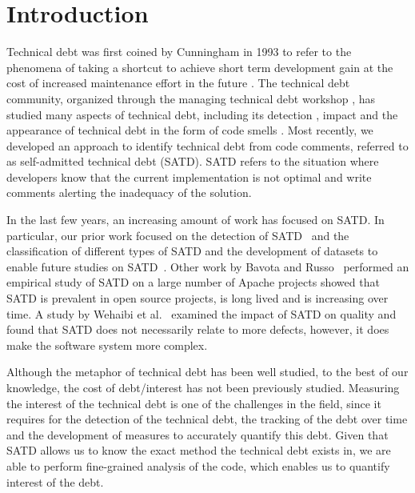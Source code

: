 \section{Introduction}
Technical debt was first coined by Cunningham in 1993 to refer to the phenomena of taking a shortcut to achieve short term development gain at the cost of increased maintenance effort in the future \cite{Cunningham1992WPM}. The technical debt community, organized through the managing technical debt workshop \cite{MTD2016}, has studied many aspects of technical debt, including its detection \cite{Zazworka2013EASE}, impact \cite{Zazworka2011MTD} and the appearance of technical debt in the form of code smells \cite{Fontana2012MTD}. Most recently, we developed an approach to identify technical debt from code comments, referred to as self-admitted technical debt (SATD). SATD refers to the situation where developers know that the current implementation is not optimal and write comments alerting the inadequacy of the solution. 

In the last few years, an increasing amount of work has focused on SATD. In particular, our prior work focused on the detection of SATD~\cite{Potdar2014ICSME} and the classification of different types of SATD and the development of datasets to enable future studies on SATD~\cite{Maldonado2015MTD}. Other work by Bavota and Russo~\cite{Bavota2016MSR} performed an empirical study of SATD on a large number of Apache projects showed that SATD is prevalent in open source projects, is long lived and is increasing over time. A study by Wehaibi et al.~\cite{Wehaibi2016SANER} examined the impact of SATD on quality and found that SATD does not necessarily relate to more defects, however, it does make the software system more complex. 

Although the metaphor of technical debt has been well studied, to the best of our knowledge, the cost of debt/interest has not been previously studied. Measuring the interest of the technical debt is one of the challenges in the field, since it requires for the detection of the technical debt, the tracking of the debt over time and the development of measures to accurately quantify this debt. Given that SATD allows us to know the exact method the technical debt exists in, we are able to perform fine-grained analysis of the code, which enables us to quantify interest of the debt. 

